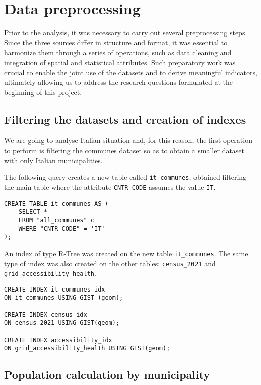 \section{Data preprocessing}

Prior to the analysis, it was necessary to carry out several preprocessing steps.
Since the three sources differ in structure and format, it was essential to harmonize them through a series of operations, such as data cleaning and integration of spatial and statistical attributes.
Such preparatory work was crucial to enable the joint use of the datasets and to derive meaningful indicators, ultimately allowing us to address the research questions formulated at the beginning of this project.


\subsection{Filtering the datasets and creation of indexes}

We are going to analyse Italian situation and, for this reason, the first operation to perform is filtering the communes dataset so as to obtain a smaller dataset with only Italian municipalities.

The following query creates a new table called \texttt{it\_communes}, obtained filtering the main table where the attribute \texttt{CNTR\_CODE} assumes the value \texttt{IT}.

\begin{verbatim}
CREATE TABLE it_communes AS (
	SELECT *
	FROM "all_communes" c
	WHERE "CNTR_CODE" = 'IT'
);
\end{verbatim}

An index of type R-Tree was created on the new table \texttt{it\_communes}.
The same type of index was also created on the other tables: \texttt{census\_2021} and \texttt{grid\_accessibility\_health}.

\begin{verbatim}
CREATE INDEX it_communes_idx
ON it_communes USING GIST (geom);

CREATE INDEX census_idx
ON census_2021 USING GIST(geom);

CREATE INDEX accessibility_idx
ON grid_accessibility_health USING GIST(geom);
\end{verbatim}



\subsection{Population calculation by municipality}

